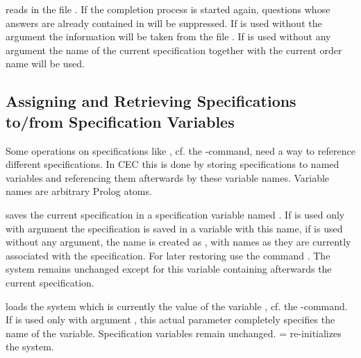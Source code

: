 \begin{command}
reads in the file . 
If the completion process is started again, %
questions whose answers are already contained in 
will be suppressed. 
If  is used without the argument  the 
information will be taken from the file .
If  is used without any argument
the name of the current specification together with the current order name
will be used.
\end{command}

\subsection{Assigning and Retrieving Specifications to/from Specification Variables }
\label{StoreCommand}
\label{LoadCommand}

Some operations on specifications like , cf. the
-command, need a way to reference different specifications. In CEC
this is done by storing specifications to named variables and referencing them
afterwards by these variable names. Variable names are arbitrary Prolog atoms.\bigskip

\begin{command}
saves the current specification in a specification variable named
. If  is used only with
argument  the specification is saved in a variable with this name,
if  is used without any argument, the name is created as 
, with names as they are currently associated 
with the specification. For later restoring 
use the command . The system remains unchanged except for this variable 
containing afterwards the current specification.
\end{command}

\begin{command}
loads the system which is currently the value of the variable
, cf. the -command. 
If  is used only with argument , this actual parameter 
completely specifies the name of the variable.
Specification variables remain unchanged.
 =  re-initializes the system.
\end{command}

